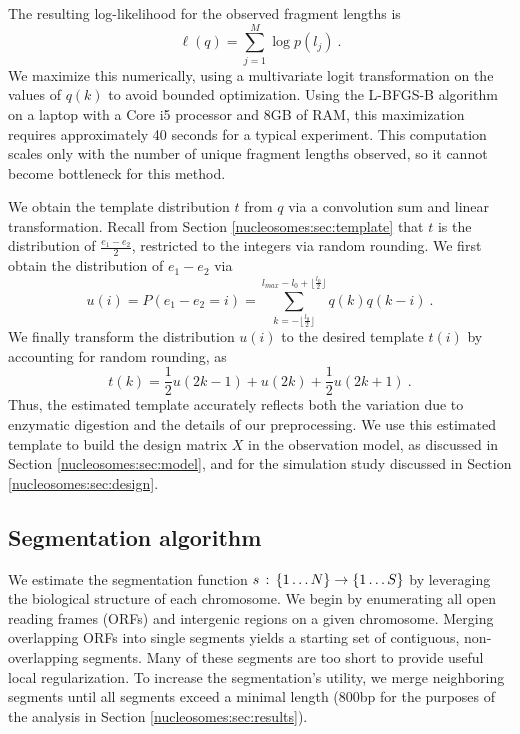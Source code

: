 The resulting log-likelihood for the observed fragment lengths is
\begin{equation}
\ell(q) = \sum_{j = 1}^{M} \log p(l_j) \ .
\end{equation}
We maximize this numerically, using a multivariate logit transformation on the values of $q(k)$ to avoid bounded optimization.
Using the L-BFGS-B algorithm \citep{lbfgsb1997} on a laptop with a Core i5 processor and 8GB of RAM, this maximization requires approximately 40 seconds for a typical experiment.
This computation scales only with the number of unique fragment lengths observed, so it cannot become bottleneck for this method.

We obtain the template distribution $t$ from $q$ via a convolution sum and  linear transformation.
Recall from Section \ref{nucleosomes:sec:template} that $t$ is the distribution of $\frac{e_1-e_2}{2}$, restricted to the integers via random rounding.
We first obtain the distribution of $e_1-e_2$ via
\begin{equation}
 u(i) = P(e_1-e_2=i) = \sum_{k=-\lfloor \frac{l_0}{2} \rfloor}^{
 l_{max} - l_0 + \lfloor \frac{l_0}{2} \rfloor}
 q(k) q(k-i) \ .
\end{equation}
We finally transform the distribution $u(i)$ to the desired template $t(i)$ by accounting for random rounding, as
\begin{equation}
 t(k) = \frac{1}{2}u(2k-1) + u(2k) + \frac{1}{2}u(2k+1) \ .
\end{equation}
Thus, the estimated template accurately reflects both the variation due to enzymatic digestion and the details of our preprocessing.
We use this estimated template to build the design matrix $X$ in the observation model, as discussed in Section \ref{nucleosomes:sec:model}, and for the simulation study discussed in Section \ref{nucleosomes:sec:design}.

\subsection{Segmentation algorithm}
\label{nucleosomes:sec:segmentationAlgorithm}

We estimate the segmentation function $s \,:\, \left\{1 \ldots N\right\} \rightarrow \left\{1 \ldots S\right\}$ by leveraging the biological structure of each chromosome.
We begin by enumerating all open reading frames (ORFs) and intergenic regions on a given chromosome.
Merging overlapping ORFs into single segments yields a starting set of contiguous, non-overlapping segments.
Many of these segments are too short to provide useful local regularization.
To increase the segmentation's utility, we merge neighboring segments until all segments exceed a minimal length (800bp for the purposes of the analysis in Section \ref{nucleosomes:sec:results}).

